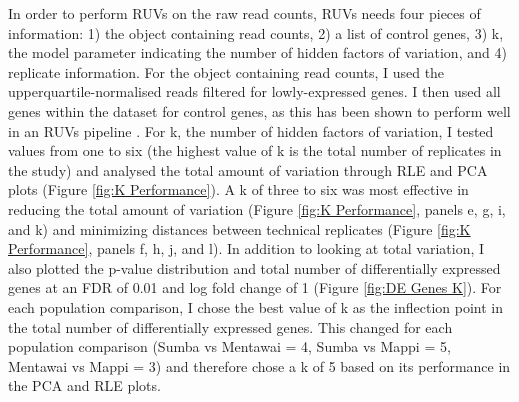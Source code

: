 \documentclass[12pt,a4paper,titlepage,twoside,openright]{book}
\begin{document}
\begin{mainmatter}
{{In order to perform RUVs on the raw read counts, RUVs needs four pieces of information: 1) the object containing read counts, 2) a list of control genes, 3) k, the model parameter indicating the number of hidden factors of variation, and 4) replicate information. For the object containing read counts, I used the upperquartile-normalised reads filtered for lowly-expressed genes. I then used all genes within the dataset for control genes, as this has been shown to perform well in an RUVs pipeline \cite{risso2014normalization}. For k, the number of hidden factors of variation, I tested values from one to six (the highest value of k is the total number of replicates in the study) and analysed the total amount of variation through RLE and PCA plots (﻿Figure \ref{fig:K Performance}﻿). A k of three to six was most effective in reducing the total amount of variation (﻿Figure \ref{fig:K Performance}, panels e, g, i, and k) and minimizing distances between technical replicates (﻿Figure \ref{fig:K Performance}, panels f, h, j, and l). In addition to looking at total variation, I also plotted the p-value distribution and total number of differentially expressed genes at an FDR of 0.01 and log fold change of 1 (﻿Figure \ref{fig:DE Genes K}). For each population comparison, I chose the best value of k as the inflection point in the total number of differentially expressed genes. This changed for each population comparison (Sumba vs Mentawai = 4, Sumba vs Mappi = 5, Mentawai vs Mappi = 3) and therefore chose a k of 5 based on its performance in the PCA and RLE plots. 

}}
\end{mainmatter}
\end{document}
